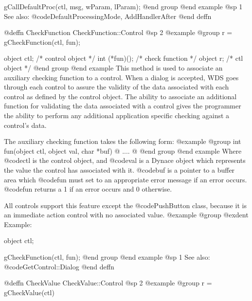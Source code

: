 gCallDefaultProc(ctl, msg, wParam, lParam);
@end group
@end example
@sp 1
See also:  @code{DefaultProcessingMode, AddHandlerAfter}
@end deffn















@deffn {CheckFunction} CheckFunction::Control
@sp 2
@example
@group
r = gCheckFunction(ctl, fun);

object  ctl;      /*  control object  */
int     (*fun)(); /*  check function  */
object  r;        /*  ctl object      */
@end group
@end example
This method is used to associate an auxiliary checking function to a control.
When a dialog is accepted, WDS goes through each control to assure the
validity of the data associated with each control as defined by the control
object.  The ability to associate an additional function for validating
the data associated with a control gives the programmer the ability to perform
any additional application specific checking against a control's data.

The auxiliary checking function takes the following form:
@example
@group
int     fun(object ctl, object val, char *buf)
@{
        ....
@}
@end group
@end example
Where @code{ctl} is the control object, and @code{val} is a Dynace object which
represents the value the control has associated with it.  @code{buf} is a
pointer to a buffer area which @code{fun} must set to an appropriate error
message if an error occurs.  @code{fun} returns a 1 if an error occurs and
0 otherwise.

All controls support this feature except the @code{PushButton} class,
because it is an immediate action control with no associated value.
@example
@group
@exdent Example:

object  ctl;

gCheckFunction(ctl, fun);
@end group
@end example
@sp 1
See also:  @code{GetControl::Dialog}
@end deffn















@deffn {CheckValue} CheckValue::Control
@sp 2
@example
@group
r = gCheckValue(ctl)

